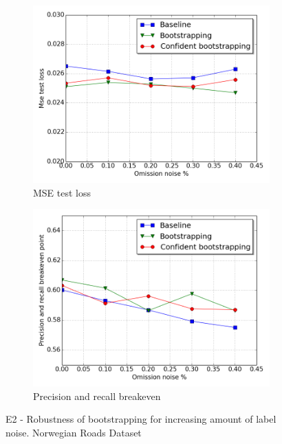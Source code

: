 \begin{figure}
\begin{subfigure}{0.5\textwidth}
\includegraphics[width=\linewidth]{figs/E2/E2-lc-noise.png}
\caption{MSE test loss} \label{fig:E2_boot_norway_loss}
\end{subfigure}
\hspace*{\fill} %
\begin{subfigure}{0.5\textwidth}
\includegraphics[width=\linewidth]{figs/E2/E2-pr-noise.png}
\caption{Precision and recall breakeven} \label{fig:E2_boot_norway_pr}
\end{subfigure}
\hspace*{\fill} %
\caption[E2 - Robustness of bootstrapping for increasing amount of label noise]{E2 - Robustness of bootstrapping for increasing amount of label noise. Norwegian Roads Dataset} \label{fig:E2_boot_norway}
\end{figure}

